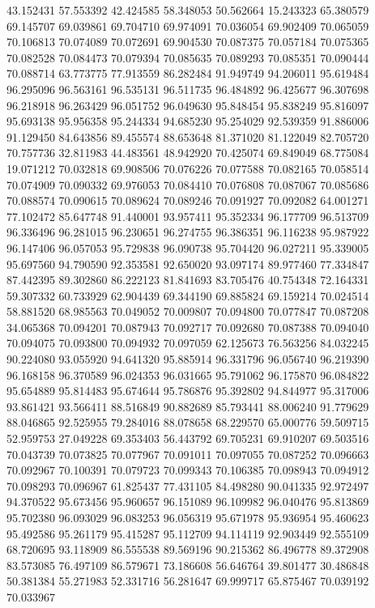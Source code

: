 43.152431
57.553392
42.424585
58.348053
50.562664
15.243323
65.380579
69.145707
69.039861
69.704710
69.974091
70.036054
69.902409
70.065059
70.106813
70.074089
70.072691
69.904530
70.087375
70.057184
70.075365
70.082528
70.084473
70.079394
70.085635
70.089293
70.085351
70.090444
70.088714
63.773775
77.913559
86.282484
91.949749
94.206011
95.619484
96.295096
96.563161
96.535131
96.511735
96.484892
96.425677
96.307698
96.218918
96.263429
96.051752
96.049630
95.848454
95.838249
95.816097
95.693138
95.956358
95.244334
94.685230
95.254029
92.539359
91.886006
91.129450
84.643856
89.455574
88.653648
81.371020
81.122049
82.705720
70.757736
32.811983
44.483561
48.942920
70.425074
69.849049
68.775084
19.071212
70.032818
69.908506
70.076226
70.077588
70.082165
70.058514
70.074909
70.090332
69.976053
70.084410
70.076808
70.087067
70.085686
70.088574
70.090615
70.089624
70.089246
70.091927
70.092082
64.001271
77.102472
85.647748
91.440001
93.957411
95.352334
96.177709
96.513709
96.336496
96.281015
96.230651
96.274755
96.386351
96.116238
95.987922
96.147406
96.057053
95.729838
96.090738
95.704420
96.027211
95.339005
95.697560
94.790590
92.353581
92.650020
93.097174
89.977460
77.334847
87.442395
89.302860
86.222123
81.841693
83.705476
40.754348
72.164331
59.307332
60.733929
62.904439
69.344190
69.885824
69.159214
70.024514
58.881520
68.985563
70.049052
70.009807
70.094800
70.077847
70.087208
34.065368
70.094201
70.087943
70.092717
70.092680
70.087388
70.094040
70.094075
70.093800
70.094932
70.097059
62.125673
76.563256
84.032245
90.224080
93.055920
94.641320
95.885914
96.331796
96.056740
96.219390
96.168158
96.370589
96.024353
96.031665
95.791062
96.175870
96.084822
95.654889
95.814483
95.674644
95.786876
95.392802
94.844977
95.317006
93.861421
93.566411
88.516849
90.882689
85.793441
88.006240
91.779629
88.046865
92.525955
79.284016
88.078658
68.229570
65.000776
59.509715
52.959753
27.049228
69.353403
56.443792
69.705231
69.910207
69.503516
70.043739
70.073825
70.077967
70.091011
70.097055
70.087252
70.096663
70.092967
70.100391
70.079723
70.099343
70.106385
70.098943
70.094912
70.098293
70.096967
61.825437
77.431105
84.498280
90.041335
92.972497
94.370522
95.673456
95.960657
96.151089
96.109982
96.040476
95.813869
95.702380
96.093029
96.083253
96.056319
95.671978
95.936954
95.460623
95.492586
95.261179
95.415287
95.112709
94.114119
92.903449
92.555109
68.720695
93.118909
86.555538
89.569196
90.215362
86.496778
89.372908
83.573085
76.497109
86.579671
73.186608
56.646764
39.801477
30.486848
50.381384
55.271983
52.331716
56.281647
69.999717
65.875467
70.039192
70.033967
